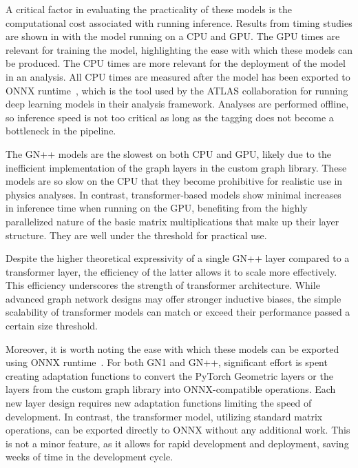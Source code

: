 A critical factor in evaluating the practicality of these models is the computational cost associated with running inference.
Results from timing studies are shown in  with the model running on a CPU and GPU\@.
The GPU times are relevant for training the model, highlighting the ease with which these models can be produced.
The CPU times are more relevant for the deployment of the model in an analysis.
All CPU times are measured after the model has been exported to ONNX runtime~\cite{onnxruntime}, which is the tool used by the \Gls{ATLAS} collaboration for running deep learning models in their analysis framework.
Analyses are performed offline, so inference speed is not too critical as long as the tagging does not become a bottleneck in the pipeline.

The \Gls{GN++} models are the slowest on both CPU and GPU, likely due to the inefficient implementation of the graph layers in the custom graph library.
These models are so slow on the CPU that they become prohibitive for realistic use in physics analyses.
In contrast, transformer-based models show minimal increases in inference time when running on the GPU, benefiting from the highly parallelized nature of the basic matrix multiplications that make up their layer structure.
They are well under the threshold for practical use.

Despite the higher theoretical expressivity of a single \Gls{GN++} layer compared to a transformer layer, the efficiency of the latter allows it to scale more effectively.
This efficiency underscores the strength of transformer architecture.
While advanced graph network designs may offer stronger inductive biases, the simple scalability of transformer models can match or exceed their performance passed a certain size threshold.

Moreover, it is worth noting the ease with which these models can be exported using ONNX runtime~\cite{onnxruntime}.
For both \Gls{GN1} and \Gls{GN++}, significant effort is spent creating adaptation functions to convert the PyTorch Geometric layers or the layers from the custom graph library into ONNX-compatible operations.
Each new layer design requires new adaptation functions limiting the speed of development.
In contrast, the transformer model, utilizing standard matrix operations, can be exported directly to ONNX without any additional work.
This is not a minor feature, as it allows for rapid development and deployment, saving weeks of time in the development cycle.

